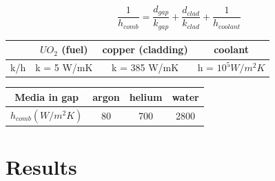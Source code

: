 \documentclass[12pt]{article}
\begin{document}
\[\frac{1}{h_{comb}} = \frac{d_{gap}}{k_{gap}} + \frac{d_{clad}}{k_{clad}} + \frac{1}{h_{coolant}}\]

\begin{center}
\begin{tabular}{ |c|c|c|c| } 
 \hline
  & $UO_2$ (fuel) & copper (cladding) & coolant \\ 
   \hline
 k/h & k = 5 W/mK & k = 385 W/mK & h =  $10^5 W/m^2K$ \\ 
 \hline
\end{tabular}
\end{center}

\begin{center}
\begin{tabular}{ |c|c|c|c| } 
 \hline
Media in gap  & argon & helium & water \\ 
   \hline
 $h_{comb} (W/m^2K)$ & 80 & 700 & 2800 \\ 
 \hline
\end{tabular}
\end{center}
\pagebreak

\section{Results}
\end{document}
